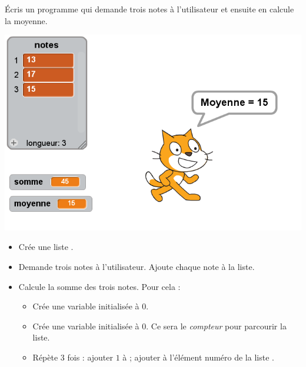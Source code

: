 \documentclass[class=report,crop=false, 12pt]{standalone}
\begin{document}





\bigskip
\bigskip

\begin{activite}

Écris un programme qui demande trois notes à l'utilisateur et ensuite en calcule la moyenne.

\begin{center}
  \includegraphics[scale=\scaleecran,scale=1.2]{ecran-12-ex1} 
\end{center}

\begin{itemize}
  \item Crée une liste .
  \item Demande trois notes à l'utilisateur. Ajoute chaque note à la liste.
    
  \item Calcule la somme des trois notes. Pour cela :
  \begin{itemize}
    \item Crée une variable  initialisée à $0$.
    
    \item Crée une variable  initialisée à $0$. Ce sera le \emph{compteur} pour parcourir la liste. 
    
    \item Répète $3$ fois : ajouter $1$ à  ; ajouter à
     l'élément numéro  de la liste .    
  \end{itemize}
  

\end{itemize}
\end{activite}
\end{document}
